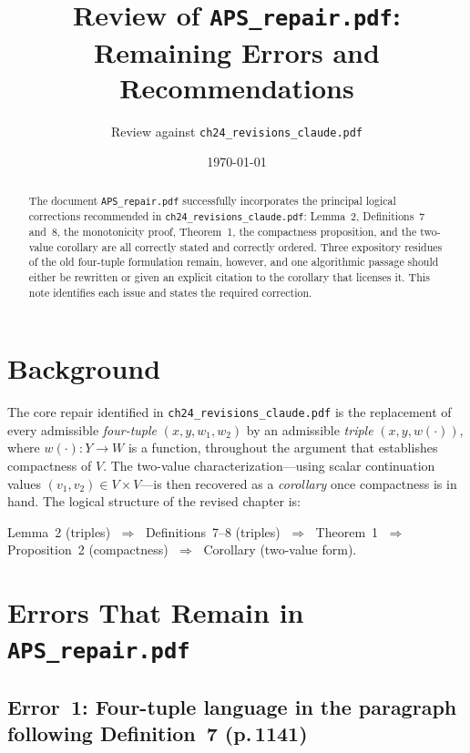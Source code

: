 \documentclass[12pt]{article}
\title{Review of \texttt{APS\_repair.pdf}:\\
Remaining Errors and Recommendations}
\author{Review against \texttt{ch24\_revisions\_claude.pdf}}
\date{\today}
\begin{document}
\maketitle

\begin{abstract}
The document \texttt{APS\_repair.pdf} successfully incorporates the principal
logical corrections recommended in \texttt{ch24\_revisions\_claude.pdf}:
Lemma~2, Definitions~7 and~8, the monotonicity proof, Theorem~1, the
compactness proposition, and the two-value corollary are all correctly
stated and correctly ordered.  Three expository residues of the old
four-tuple formulation remain, however, and one algorithmic passage
should either be rewritten or given an explicit citation to the corollary
that licenses it.  This note identifies each issue and states the required
correction.
\end{abstract}

\section{Background}

The core repair identified in \texttt{ch24\_revisions\_claude.pdf} is the
replacement of every admissible \emph{four-tuple} $(x,y,w_1,w_2)$ by an
admissible \emph{triple} $(x,y,w(\cdot))$, where $w(\cdot):Y\to W$ is a
function, throughout the argument that establishes compactness of $V$.
The two-value characterization---using scalar continuation values
$(v_1,v_2)\in V\times V$---is then recovered as a \emph{corollary} once
compactness is in hand.  The logical structure of the revised chapter is:

\begin{center}
Lemma~2 (triples) $\;\Rightarrow\;$
Definitions~7--8 (triples) $\;\Rightarrow\;$
Theorem~1 $\;\Rightarrow\;$
Proposition~2 (compactness) $\;\Rightarrow\;$
Corollary (two-value form).
\end{center}

\section{Errors That Remain in \texttt{APS\_repair.pdf}}

\subsection{Error~1: Four-tuple language in the paragraph following
Definition~7 (p.\,1141)}
\end{document}
